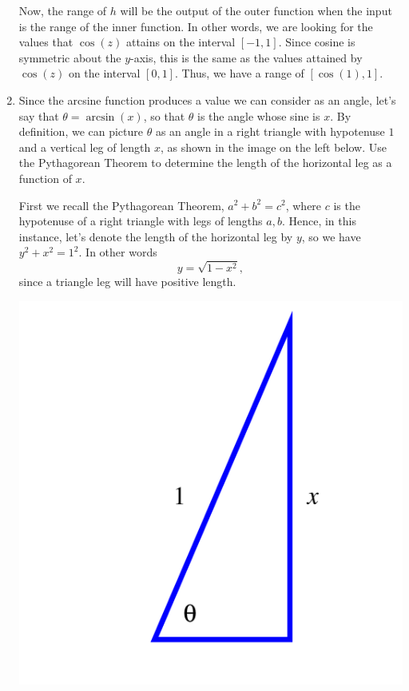 \documentclass{ximera}
\begin{document}
\begin{example}
\begin{enumerate}
\begin{explanation}
Now, the range of $h$ will be the output of the outer function when the input is the range of the inner function. In other words, we are looking for the values that $\cos(z)$ attains on the interval $[-1,1]$. Since cosine is symmetric about the $y$-axis, this is the same as the values attained by $\cos(z)$ on the interval $[0,1]$. Thus, we have a range of $[\cos(1),1]$.
\end{explanation}
%
\item Since the arcsine function produces a value we can consider as an angle, let's say that $\theta = \arcsin(x)$,  so that $\theta$ is the angle whose sine is $x$.  By definition, we can picture $\theta$ as an angle in a right triangle with hypotenuse $1$ and a vertical leg of length $x$, as shown in the image on the left below.  Use the Pythagorean Theorem to determine the length of the horizontal leg as a function of $x$. \\
%
\begin{explanation}
First we recall the Pythagorean Theorem, $a^2 +b^2 = c^2$, where $c$ is the hypotenuse of a right triangle with legs of lengths $a,b$. Hence, in this instance, let's denote the length of the horizontal leg by $y$, so we have $y^2 + x^2 = 1^2$. In other words
%
$$y = \sqrt{1-x^2},$$
%
since a triangle leg will have positive length.
\end{explanation}
%
\begin{image}
\includegraphics{inv-trig-cosarcsin.png}

\end{image}
\end{enumerate}
\end{example}
\end{document}
